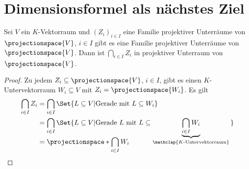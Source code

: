 \section*{Dimensionsformel als nächstes Ziel}
\begin{lemma}\label{schnitt_von_projektiven_unterraeumen_ist_projektiver_unterraum}
  Sei \( V \) ein \( K \)-Vektorraum und \( (Z_i)_{i\in I} \) eine Familie projektiver Unterräume von \( \projectionspace{V} \), \( i\in I \) gibt es eine Familie projektiver Unterräume von \( \projectionspace{V} \). Dann ist \( \bigcap_{i\in I} Z_i \) in projektiver Unterraum von \( \projectionspace{V} \).
\end{lemma}
\begin{proof}
  Zu jedem \( Z_i\subseteq \projectionspace{V} \), \( i\in I \), gibt es einen \( K \)-Untervektorraum \( W_i\subseteq V \) mit \( Z_i=\projectionspace{W_i} \). Es gilt
  \begin{equation*}
    \begin{split}
      \bigcap_{i\in I}Z_i&=\bigcap_{i\in I}\Set{L\subseteq V|\text{Gerade mit \( L\subseteq W_i \)}}\\
      &=\bigcap_{i\in I}\Set{L\subseteq V|\text{Gerade \( L \) mit \( L\subseteq  \smash{\underbrace{\bigcap_{i\in I}W_i}_{\mathclap{\text{\( K \)-Untervektorraum}}}\vphantom{\bigcup_{i\in I}}}\)}}\\
      &=\projectionspace*{\bigcap_{i\in I} W_i}
    \end{split}
  \end{equation*}
\end{proof}
\addtocounter{beispiel}{-1}
